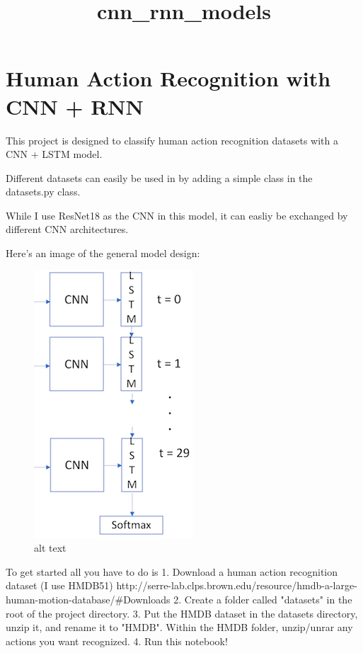 \documentclass[11pt]{article}
\title{cnn\_rnn\_models}
\makeatletter
\def\maxwidth{\ifdim\Gin@nat@width>\linewidth\linewidth
    \else\Gin@nat@width\fi}
\let\Oldincludegraphics\includegraphics
\renewcommand{\includegraphics}[1]{\Oldincludegraphics[width=.8\maxwidth]{#1}}
\makeatother
\begin{document}
    
    
    \maketitle
    
    

    
    \section{Human Action Recognition with CNN +
RNN}\label{human-action-recognition-with-cnn-rnn}

This project is designed to classify human action recognition datasets
with a CNN + LSTM model.

Different datasets can easily be used in by adding a simple class in the
datasets.py class.

While I use ResNet18 as the CNN in this model, it can easliy be
exchanged by different CNN architectures.

Here's an image of the general model design:

\begin{figure}
\centering
\includegraphics{architecture1.png}
\caption{alt text}
\end{figure}

To get started all you have to do is 1. Download a human action
recognition dataset (I use HMDB51)
http://serre-lab.clps.brown.edu/resource/hmdb-a-large-human-motion-database/\#Downloads
2. Create a folder called "datasets" in the root of the project
directory. 3. Put the HMDB dataset in the datasets directory, unzip it,
and rename it to "HMDB". Within the HMDB folder, unzip/unrar any actions
you want recognized. 4. Run this notebook!
\end{document}
